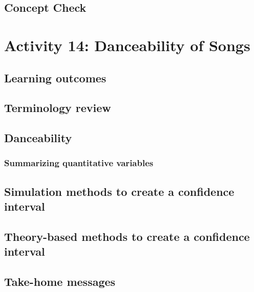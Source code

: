 \documentclass[
]{report}
\begin{document}
\subsection{Concept Check}\label{concept-check-6}

\section{Activity 14: Danceability of Songs}\label{activity-14-danceability-of-songs}

\subsection{Learning outcomes}\label{learning-outcomes-14}

\subsection{Terminology review}\label{terminology-review-12}

\subsection{Danceability}\label{danceability}

\subsubsection*{Summarizing quantitative variables}\label{summarizing-quantitative-variables-2}

\subsection*{Simulation methods to create a confidence interval}\label{simulation-methods-to-create-a-confidence-interval}

\subsection*{Theory-based methods to create a confidence interval}\label{theory-based-methods-to-create-a-confidence-interval}

\subsection{Take-home messages}\label{take-home-messages-13}
\end{document}
